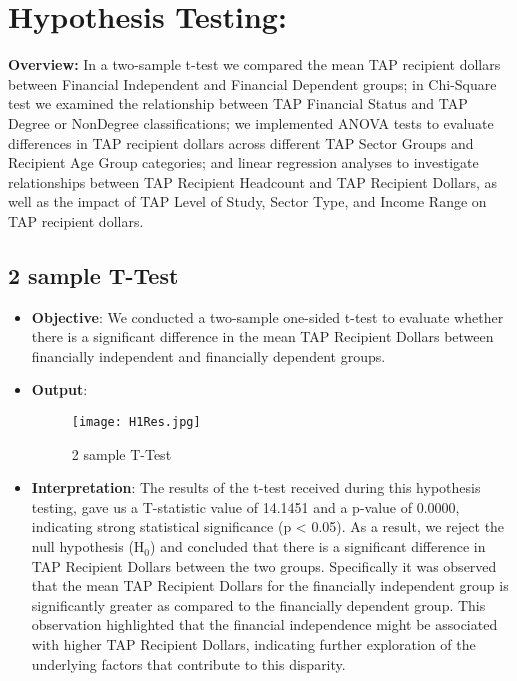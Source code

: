 \documentclass[sigconf]{acmart}
\begin{document}
\section{Hypothesis Testing:}

\textbf{Overview:}
In a two-sample t-test we compared the mean TAP recipient dollars between Financial Independent and Financial Dependent groups; in Chi-Square test we examined the relationship between TAP Financial Status and TAP Degree or NonDegree classifications; we implemented ANOVA tests to evaluate differences in TAP recipient dollars across different TAP Sector Groups and Recipient Age Group categories; and linear regression analyses to investigate relationships between TAP Recipient Headcount and TAP Recipient Dollars, as well as the impact of TAP Level of Study, Sector Type, and Income Range on TAP recipient dollars. 

\subsection{2 sample T-Test}
\begin{itemize}
    \item \textbf{Objective}: We conducted a two-sample one-sided t-test to evaluate whether there is a significant difference in the mean TAP Recipient Dollars between financially independent and financially dependent groups.
    \item \textbf{Output}:
    \begin{figure}[h] 
    \centering
    \texttt{[image: H1Res.jpg]} 
    \caption{2 sample T-Test} 
    \label{fig:data_testing} 
    \end{figure}
    \item \textbf{Interpretation}: The results of the t-test received during this hypothesis testing, gave us a T-statistic value of 14.1451 and a p-value of 0.0000, indicating strong statistical significance (p < 0.05). As a result, we reject the null hypothesis (H$_0$) and concluded that there is a significant difference in TAP Recipient Dollars between the two groups. Specifically it was observed that the mean TAP Recipient Dollars for the financially independent group is significantly greater as compared to the financially dependent group. This observation highlighted that the financial independence might be associated with higher TAP Recipient Dollars, indicating further exploration of the underlying factors that contribute to this disparity.
\end{itemize}
\end{document}
